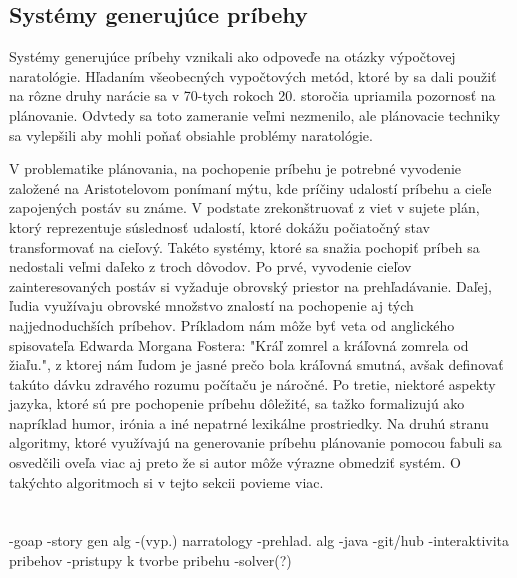 \subsection{Systémy generujúce príbehy}
Systémy generujúce príbehy vznikali ako odpoveďe na otázky výpočtovej naratológie. Hľadaním všeobecných vypočtových metód, ktoré by sa dali použiť na rôzne druhy narácie sa v 70-tych rokoch 20. storočia upriamila pozornosť na plánovanie. Odvtedy sa toto zameranie veľmi nezmenilo, ale plánovacie techniky sa vylepšili aby mohli poňať obsiahle problémy naratológie.\par
V problematike plánovania, na pochopenie príbehu je potrebné vyvodenie založené na Aristotelovom ponímaní mýtu, kde príčiny udalostí príbehu a cieľe zapojených postáv su známe. V podstate zrekonštruovať z viet v sujete plán, ktorý reprezentuje súslednosť udalostí, ktoré dokážu počiatočný stav transformovať na cieľový. Takéto systémy, ktoré sa snažia pochopiť príbeh sa nedostali veľmi daľeko z troch dôvodov. Po prvé, vyvodenie cieľov zainteresovaných postáv si vyžaduje obrovský priestor na prehľadávanie. Daľej, ľudia využívaju obrovské množstvo znalostí na pochopenie aj tých najjednoduchších príbehov. Príkladom nám môže byť veta od anglického spisovateľa Edwarda Morgana Fostera: "Kráľ zomrel a kráľovná zomrela od žiaľu.", z ktorej nám ľudom je jasné prečo bola kráľovná smutná, avšak definovať takúto dávku zdravého rozumu počítaču je náročné. Po tretie, niektoré aspekty jazyka, ktoré sú pre pochopenie príbehu dôležité, sa tažko formalizujú ako napríklad humor, irónia a iné nepatrné lexikálne prostriedky. Na druhú stranu algoritmy, ktoré využívajú na generovanie príbehu plánovanie pomocou fabuli sa osvedčili oveľa viac aj preto že si autor môže výrazne obmedziť systém. O takýchto algoritmoch si v tejto sekcii povieme viac. 
\\
\\
\\


-goap
-story gen alg
-(vyp.) narratology
-prehlad. alg
-java
-git/hub
-interaktivita pribehov
-pristupy k tvorbe pribehu
-solver(?)